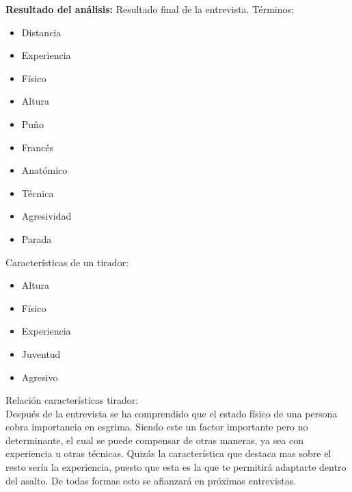 \textbf{Resultado del análisis:} Resultado final de la entrevista.
Términos:
\begin{itemize}
  \item Distancia
  \item Experiencia
  \item Físico
  \item Altura
  \item Puño
  \item Francés
  \item Anatómico
  \item Técnica
  \item Agresividad
  \item Parada
\end{itemize}

Características de un tirador:
\begin{itemize}
  \item Altura
  \item Físico
  \item Experiencia
  \item Juventud
  \item Agresivo
\end{itemize}

Relación características tirador: \\
Después de la entrevista se ha comprendido que el estado físico de una persona cobra importancia
 en esgrima. Siendo este un factor importante pero no determinante, el cual se puede
 compensar de otras maneras, ya sea con experiencia u otras técnicas. Quizás la característica
 que destaca mas sobre el resto sería la experiencia, puesto que esta es la que te permitirá
 adaptarte dentro del asalto. De todas formas esto se afianzará en próximas entrevistas.
